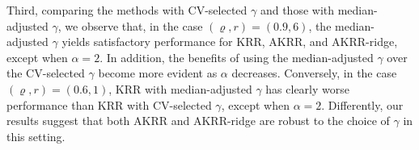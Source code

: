 \documentclass[11pt,twoside]{article}
\begin{document}
Third, 
comparing the methods with CV-selected $\gamma$ and those with median-adjusted $\gamma$, we observe that, in the case $(\varrho, r) = (0.9, 6)$, 
the median-adjusted $\gamma$ yields satisfactory performance for KRR, AKRR, and AKRR-ridge, except when $\alpha =2$. In addition, the benefits of using the median-adjusted $\gamma$ over the CV-selected $\gamma$ become more evident as $\alpha$  decreases. Conversely, in the case $(\varrho, r) = (0.6, 1)$, 
KRR with median-adjusted $\gamma$ has clearly worse performance than KRR with  CV-selected $\gamma$, except when $\alpha =2$. Differently, our results suggest that
both AKRR and AKRR-ridge are robust to the choice of  $\gamma$ in this setting. 
\end{document}
